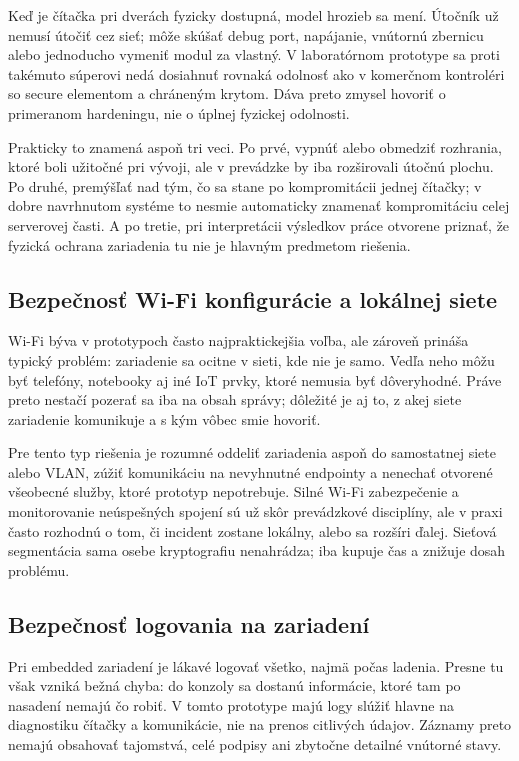 \documentclass[journal,a4paper,onecolumn]{IEEEtran}
\begin{document}
Keď je čítačka pri dverách fyzicky dostupná, model hrozieb sa mení. Útočník už nemusí útočiť cez sieť; môže skúšať debug port, napájanie, vnútornú zbernicu alebo jednoducho vymeniť modul za vlastný. V laboratórnom prototype sa proti takémuto súperovi nedá dosiahnuť rovnaká odolnosť ako v komerčnom kontroléri so secure elementom a chráneným krytom. Dáva preto zmysel hovoriť o primeranom hardeningu, nie o úplnej fyzickej odolnosti.

Prakticky to znamená aspoň tri veci. Po prvé, vypnúť alebo obmedziť rozhrania, ktoré boli užitočné pri vývoji, ale v prevádzke by iba rozširovali útočnú plochu. Po druhé, premýšľať nad tým, čo sa stane po kompromitácii jednej čítačky; v dobre navrhnutom systéme to nesmie automaticky znamenať kompromitáciu celej serverovej časti. A po tretie, pri interpretácii výsledkov práce otvorene priznať, že fyzická ochrana zariadenia tu nie je hlavným predmetom riešenia.

\subsection{Bezpečnosť Wi-Fi konfigurácie a lokálnej siete}

Wi-Fi býva v prototypoch často najpraktickejšia voľba, ale zároveň prináša typický problém: zariadenie sa ocitne v sieti, kde nie je samo. Vedľa neho môžu byť telefóny, notebooky aj iné IoT prvky, ktoré nemusia byť dôveryhodné. Práve preto nestačí pozerať sa iba na obsah správy; dôležité je aj to, z akej siete zariadenie komunikuje a s kým vôbec smie hovoriť.

Pre tento typ riešenia je rozumné oddeliť zariadenia aspoň do samostatnej siete alebo VLAN, zúžiť komunikáciu na nevyhnutné endpointy a nenechať otvorené všeobecné služby, ktoré prototyp nepotrebuje. Silné Wi-Fi zabezpečenie a monitorovanie neúspešných spojení sú už skôr prevádzkové disciplíny, ale v praxi často rozhodnú o tom, či incident zostane lokálny, alebo sa rozšíri ďalej. Sieťová segmentácia sama osebe kryptografiu nenahrádza; iba kupuje čas a znižuje dosah problému.

\subsection{Bezpečnosť logovania na zariadení}

Pri embedded zariadení je lákavé logovať všetko, najmä počas ladenia. Presne tu však vzniká bežná chyba: do konzoly sa dostanú informácie, ktoré tam po nasadení nemajú čo robiť. V tomto prototype majú logy slúžiť hlavne na diagnostiku čítačky a komunikácie, nie na prenos citlivých údajov. Záznamy preto nemajú obsahovať tajomstvá, celé podpisy ani zbytočne detailné vnútorné stavy.
\end{document}
